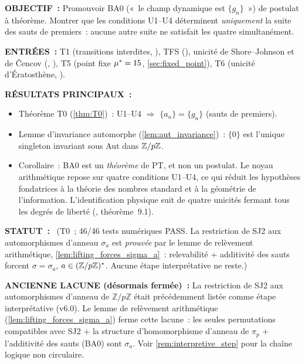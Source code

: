 \documentclass[12pt,a4paper]{article}
\begin{document}
\begin{statusbox}
\textbf{OBJECTIF~:}
  Promouvoir BA0 («~le champ dynamique est $\{g_n\}$~») de postulat
  à théorème. Montrer que les conditions U1--U4 déterminent
  \emph{uniquement} la suite des sauts de premiers~: aucune autre
  suite ne satisfait les quatre simultanément.

\textbf{ENTRÉES~:}
  T1 (transitions interdites, \cite{companion_M1}), TFS
  (\cite{companion_M1}), unicité de Shore--Johnson et de \v{C}encov
  (\cite{companion_M1}, \cite{companion_M2}), T5 (point fixe
  ${\mu^{*}} = 15$, \cref{sec:fixed_point}), T6 (unicité d'Ératosthène,
  \cite{companion_M1}).

\textbf{RÉSULTATS PRINCIPAUX~:}
  \begin{itemize}[nosep]
  \item Théorème T0 (\cref{thm:T0})~: U1--U4 $\Rightarrow$
    $\{a_n\} = \{g_n\}$ (sauts de premiers).
  \item Lemme d'invariance automorphe (\cref{lem:aut_invariance})~:
    $\{0\}$ est l'unique singleton invariant sous Aut dans $\mathbb{Z}/p\mathbb{Z}$.
  \item Corollaire~: BA0 est un \emph{théorème} de PT, et non un
    postulat. Le noyau arithmétique repose sur quatre conditions
    U1--U4, ce qui réduit les hypothèses fondatrices à la théorie
    des nombres standard et à la géométrie de l'information.
    L'identification physique suit de quatre unicités fermant tous
    les degrés de liberté (\cite{companion_M5}, théorème~9.1).
  \end{itemize}

\textbf{STATUT~:}
  \THMTAG~(T0~; 46/46 tests numériques PASS. La restriction de SJ2
  aux automorphismes d'anneau $\sigma_a$ est \emph{prouvée} par le
  lemme de relèvement arithmétique, \cref{lem:lifting_forces_sigma_a}~:
  relevabilité + additivité des sauts forcent
  $\sigma = \sigma_a$, $a \in (\mathbb{Z}/p\mathbb{Z})^*$. Aucune étape interprétative
  ne reste.)

\textbf{ANCIENNE LACUNE (désormais fermée)~:}
  La restriction de SJ2 aux automorphismes d'anneau de
  $\mathbb{Z}/p\mathbb{Z}$ était précédemment listée comme étape
  interprétative (v6.0). Le lemme de relèvement arithmétique
  (\cref{lem:lifting_forces_sigma_a}) ferme cette lacune~: les seules
  permutations compatibles avec SJ2 + la structure d'homomorphisme
  d'anneau de $\pi_p$ + l'additivité des sauts (BA0) sont $\sigma_a$.
  Voir \cref{rem:interpretive_step} pour la chaîne logique
  non circulaire.
\end{statusbox}
\end{document}
